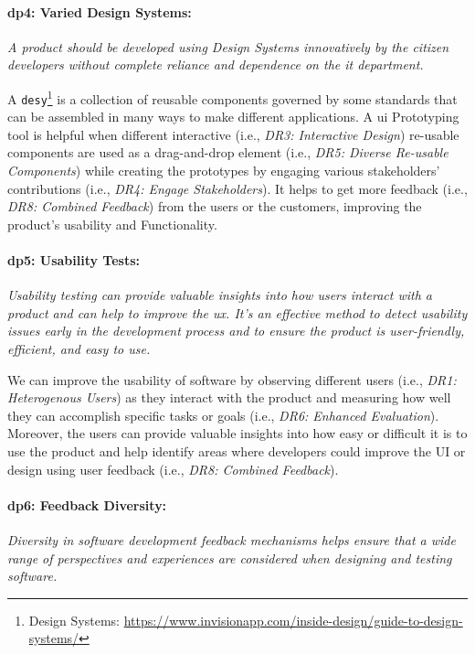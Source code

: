 \paragraph{\ac{dp}4: Varied Design Systems:} \textit{A product should be developed using Design Systems innovatively by the citizen developers without complete reliance and dependence on the \ac{it} department.}

A \texttt{\ac{desy}}\footnote{Design Systems: \url{https://www.invisionapp.com/inside-design/guide-to-design-systems/}} is a collection of reusable components governed by some standards that can be assembled in many ways to make different applications.
A \ac{ui} Prototyping tool is helpful when different interactive (i.e., \textit{DR3: Interactive Design}) re-usable components are used as a drag-and-drop element (i.e., \textit{DR5: Diverse Re-usable Components}) while creating the prototypes by engaging various stakeholders' contributions (i.e., \textit{DR4: Engage Stakeholders}). 
It helps to get more feedback (i.e., \textit{DR8: Combined Feedback}) from the users or the customers, improving the product's usability and Functionality.

\paragraph{\ac{dp}5: Usability Tests:} \textit{Usability testing can provide valuable insights into how users interact with a product and can help to improve the \ac{ux}. It's an effective method to detect usability issues early in the development process and to ensure the product is user-friendly, efficient, and easy to use.}

We can improve the usability of software by observing different users (i.e., \textit{DR1: Heterogenous Users}) as they interact with the product and measuring how well they can accomplish specific tasks or goals (i.e., \textit{DR6: Enhanced Evaluation}).
Moreover, the users can provide valuable insights into how easy or difficult it is to use the product and help identify areas where developers could improve the UI or design using user feedback (i.e., \textit{DR8: Combined Feedback}). 

\paragraph{\ac{dp}6: Feedback Diversity:} \textit{Diversity in software development feedback mechanisms helps ensure that a wide range of perspectives and experiences are considered when designing and testing software.}

